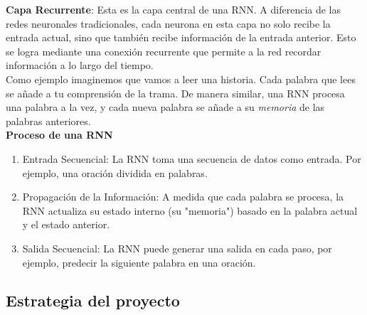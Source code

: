 \textbf{Capa Recurrente}: Esta es la capa central de una RNN. A diferencia de las redes neuronales 
tradicionales, cada neurona en esta capa no solo recibe la entrada actual, sino que también 
recibe información de la entrada anterior. Esto se logra mediante una conexión recurrente 
que permite a la red recordar información a lo largo del tiempo.\\ 

Como ejemplo imaginemos que vamos a leer una historia. Cada palabra que lees se añade a tu 
comprensión de la trama. De manera similar, una RNN procesa una palabra a la vez, y cada 
nueva palabra se añade a su \textit{memoria} de las palabras anteriores.\\ 

\textbf{Proceso de una RNN}

\begin{enumerate}
    \item Entrada Secuencial: La RNN toma una secuencia de datos como entrada. Por ejemplo, 
    una oración dividida en palabras.
    \item Propagación de la Información: A medida que cada palabra se procesa, la RNN actualiza 
    su estado interno (su "memoria") basado en la palabra actual y el estado anterior.
    \item Salida Secuencial: La RNN puede generar una salida en cada paso, por ejemplo, 
    predecir la siguiente palabra en una oración.
\end{enumerate}


\subsection{Estrategia del proyecto}

